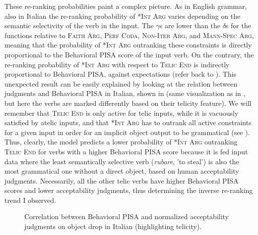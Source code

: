 These re-ranking probabilities paint a complex picture. As in English grammar, also in Italian the re-ranking probability of \textsc{*Int Arg} varies depending on the semantic selectivity of the verb in the input. The $\gamma$s are lower than the $\delta$s for the functions relative to \textsc{Faith Arg}, \textsc{Perf Coda}, \textsc{Non-Iter Arg}, and \textsc{Mann-Spec Arg}, meaning that the probability of \textsc{*Int Arg} outranking these constraints is directly proportional to the Behavioral PISA score of the input verb. On the contrary, the re-ranking probability of \textsc{*Int Arg} with respect to \textsc{Telic End} is indirectly proportional to Behavioral PISA, against expectations (refer back to ). This unexpected result can be easily explained by looking at the relation between judgments and Behavioral PISA in Italian, shown in  (same visualization as in , but here the verbs are marked differently based on their telicity feature). We will remember that \textsc{Telic End} is only active for telic inputs, while it is vacuously satisfied by atelic inputs, and that \textsc{*Int Arg} has to outrank all active constraints for a given input in order for an implicit object output to be grammatical (see ). Thus, clearly, the model predicts a lower probability of \textsc{*Int Arg} outranking \textsc{Telic End} for verbs with a higher Behavioral PISA score because it is fed input data where the least semantically selective verb (\textit{rubare}, 'to steal') is also the most grammatical one without a direct object, based on human acceptability judgments. Necessarily, all the other telic verbs have higher Behavioral PISA scores and lower acceptability judgments, thus determining the inverse re-ranking trend I observed.

\begin{figure}[htb]
\caption{Correlation between Behavioral PISA and normalized acceptability judgments on object drop in Italian (highlighting telicity).}
    
\end{figure}

